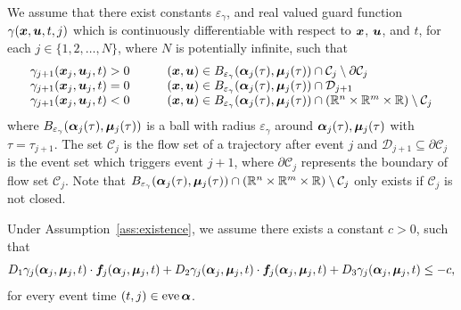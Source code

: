 \documentclass[../DC2017114Bouma.tex]{subfiles}
\begin{document}
\begin{sloppypar}
\begin{myass}\label{ass:existence}
We assume that there exist constants $\varepsilon_\gamma$, and real valued guard function $\gamma({\boldsymbol{x}},{\boldsymbol{u}},t,j)$ which is continuously differentiable with respect to ${\boldsymbol{x}}$, ${\boldsymbol{u}}$, and $t$, for each $j\in \{1,2,\dots,N\}$, where $N$ is potentially infinite, such that
\begin{equation}
\begin{array}{llll}
\gamma_{j+1}({\boldsymbol{x}}_j,{\boldsymbol{u}}_j,t) > 0 & &	&({\boldsymbol{x}},{\boldsymbol{u}}) \in B_{\varepsilon_\gamma}(\boldsymbol{\alpha}_j(\tau),\boldsymbol{\mu}_j(\tau))\cap \mathcal{C}_j\setminus\partial \mathcal{C}_j\\
\gamma_{j+1}({\boldsymbol{x}}_j,{\boldsymbol{u}}_j,t) = 0 & &	&({\boldsymbol{x}},{\boldsymbol{u}}) \in B_{\varepsilon_\gamma}(\boldsymbol{\alpha}_j(\tau),\boldsymbol{\mu}_j(\tau))\cap \mathcal{D}_{j+1}\\
\gamma_{j+1}({\boldsymbol{x}}_j,{\boldsymbol{u}}_j,t) < 0 & &	&({\boldsymbol{x}},{\boldsymbol{u}}) \in B_{\varepsilon_\gamma}(\boldsymbol{\alpha}_j(\tau),\boldsymbol{\mu}_j(\tau))\cap (\mathbb{R}^n \times \mathbb{R}^m \times \mathbb{R})\setminus \mathcal{C}_j
\end{array}
\end{equation}
where $B_{\varepsilon_\gamma}(\boldsymbol{\alpha}_j(\tau),\boldsymbol{\mu}_j(\tau))$ is a ball with radius $\varepsilon_{\gamma}$ around $\boldsymbol{\alpha}_j(\tau),\boldsymbol{\mu}_j(\tau)$ with $\tau = \tau_{j+1}$. The set $\mathcal{C}_j$ is the flow set of a trajectory after event $j$ and $\mathcal{D}_{j+1}\subseteq\partial \mathcal{C}_j$ is the event set which triggers event $j+1$, where $\partial \mathcal{C}_j$ represents the boundary of flow set $\mathcal{C}_j$. Note that $B_{\varepsilon_\gamma}(\boldsymbol{\alpha}_j(\tau),\boldsymbol{\mu}_j(\tau))\cap (\mathbb{R}^n \times \mathbb{R}^m \times \mathbb{R})\setminus \mathcal{C}_j$ only exists if $\mathcal{C}_j$ is not closed.
\end{myass}
\end{sloppypar}

\begin{sloppypar}
\begin{myass}\label{ass:transversality}
Under Assumption~\ref{ass:existence}, we assume there exists a constant $c>0$, such that
\begin{equation}
D_1\gamma_j(\boldsymbol{\alpha}_j,\boldsymbol{\mu}_j,t)\cdot{\boldsymbol{f}}_j(\boldsymbol{\alpha}_j,\boldsymbol{\mu}_j,t) + D_2\gamma_j(\boldsymbol{\alpha}_j,\boldsymbol{\mu}_j,t)\cdot{\boldsymbol{f}}_j(\boldsymbol{\alpha}_j,\boldsymbol{\mu}_j,t) + D_3\gamma_j(\boldsymbol{\alpha}_j,\boldsymbol{\mu}_j,t) \leq -c,
\end{equation}
for every event time $(t,j) \in \operatorname{\textnormal{eve}} \boldsymbol{\alpha}$.
\end{myass}
\end{sloppypar}
\end{document}
